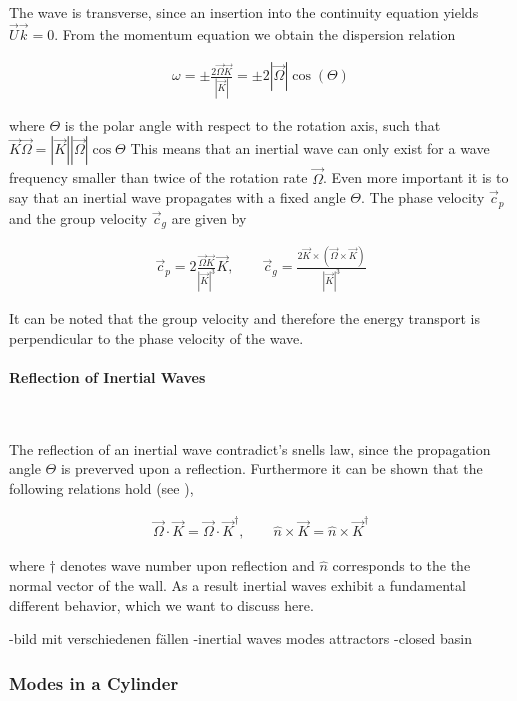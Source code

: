 The wave is transverse, since an insertion into the continuity equation yields $\vec{U}\vec{k} = 0$.
From the momentum equation we obtain the dispersion relation

\begin{align}
    \omega = \pm \frac{ 2\vec{\Omega}\vec{K}}{|\vec{K}|} = \pm 2|\vec{\Omega}|\cos(\Theta)
\end{align}

where $\Theta$ is the polar angle with respect to the rotation axis,
such that $\vec{K}\vec{\Omega} = |\vec{K}||\vec{\Omega}|\cos{\Theta}$
This means that an inertial wave can only exist for a wave frequency smaller than twice of the rotation rate $\vec{\Omega}$.
Even more important it is to say that an inertial wave propagates with a fixed angle $\Theta$.
The phase velocity $\vec{c}_p$ and the group velocity $\vec{c}_g$ are given by

\begin{align}
    \vec{c}_p = 2 \frac{\vec{\Omega} \vec{K} }{|\vec{K}|^3} \vec{K}, \qquad
    \vec{c}_g = \frac{2 \vec{K} \times (\vec{\Omega} \times \vec{K})}{|\vec{K}|^3}
\end{align}

It can be noted that the group velocity and therefore the energy transport is perpendicular to the phase velocity of the wave.

\paragraph{Reflection of Inertial Waves}\mbox{}\\
\label{theorie:sec:iwreflec}

The reflection of an inertial wave contradict's snells law, since the propagation angle $\Theta$ is preverved upon a reflection.
Furthermore it can be shown that the following relations hold (see \cite{Beardsley1970}),

\begin{align}
\vec{\Omega}\cdot \vec{K} =  \vec{\Omega}\cdot\vec{K}^\dagger, \qquad \hat{n} \times \vec{K} = \hat{n} \times \vec{K}^\dagger
\end{align}

where $\dagger$ denotes wave number upon reflection and $\hat{n}$ corresponds to the the normal vector of the wall.
As a result inertial waves exhibit a fundamental different behavior, which we want to discuss here.

-bild mit verschiedenen fällen
-inertial waves modes attractors
-closed basin
\subsubsection{Modes in a Cylinder}

